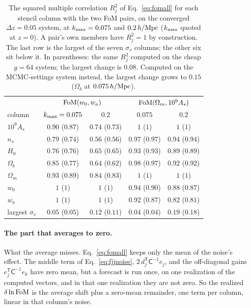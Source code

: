 \documentclass[11pt]{article}
\newcommand{\Cov}{\mathsf{C}}
\newcommand{\T}{^{\mathsf{T}}}
\newcommand{\kmax}{k_{\rm max}}
\newcommand{\hMpc}{\,h/{\rm Mpc}}
\begin{document}
\begin{table}[tbp]
  \centering
  \begin{tabular}{lcccc}
    \hline
    & \multicolumn{2}{c}{${\rm FoM}(w_0, w_a)$}
    & \multicolumn{2}{c}{${\rm FoM}(\Omega_m, 10^9 A_s)$} \\
    column & $\kmax = 0.075$ & $0.2$ & $0.075$ & $0.2$ \\
    \hline
    $10^9 A_s$ & $0.90$ ($0.87$) & $0.74$ ($0.73$) & $1$ ($1$) & $1$ ($1$) \\
    $n_s$      & $0.79$ ($0.74$) & $0.56$ ($0.56$) & $0.97$ ($0.97$) & $0.94$ ($0.94$) \\
    $H_0$      & $0.76$ ($0.76$) & $0.65$ ($0.65$) & $0.93$ ($0.93$) & $0.89$ ($0.89$) \\
    $\Omega_b$ & $0.85$ ($0.77$) & $0.64$ ($0.62$) & $0.98$ ($0.97$) & $0.92$ ($0.92$) \\
    $\Omega_m$ & $0.93$ ($0.89$) & $0.84$ ($0.83$) & $1$ ($1$) & $1$ ($1$) \\
    $w_0$      & $1$ ($1$) & $1$ ($1$) & $0.94$ ($0.90$) & $0.88$ ($0.87$) \\
    $w_a$      & $1$ ($1$) & $1$ ($1$) & $0.92$ ($0.87$) & $0.82$ ($0.81$) \\
    largest $\sigma_v$ & $0.05$ ($0.05$) & $0.12$ ($0.11$) & $0.04$ ($0.04$) & $0.19$ ($0.18$) \\
    \hline
  \end{tabular}
  \caption{The squared multiple correlation $R_j^2$ of
    Eq.~\eqref{eq:fomall} for each stencil column with the two FoM
    pairs, on the converged $\Delta z = 0.05$ system, at
    $\kmax = 0.075$ and $0.2\hMpc$ ($\kmax$ quoted at $z = 0$).  A
    pair's own members have $R_j^2 = 1$ by construction.  The last
    row is the largest of the seven $\sigma_v$ columns; the other six
    sit below it.  In parentheses: the same $R_j^2$ computed on the
    cheap $g = 64$ system; the largest change is $0.08$.  Computed
    on the MCMC-settings system instead, the largest change grows to
    $0.15$ ($\Omega_b$ at $0.075\hMpc$).}
  \label{tab:rj2}
\end{table}

\paragraph{The part that averages to zero.}
What the average misses.  Eq.~\eqref{eq:fomall} keeps only the mean of
the noise's effect.  The middle term of Eq.~\eqref{eq:fjjnoise},
$2\,d_j\T\Cov^{-1}e_j$, and the off-diagonal gains $e_j\T\Cov^{-1}e_k$
have zero mean, but a forecast is run once, on one realization of the
computed vectors, and in that one realization they are not zero.  So
the realized $\delta\ln{\rm FoM}$ is the average shift plus a
zero-mean remainder, one term per column, linear in that column's
noise.
\end{document}
